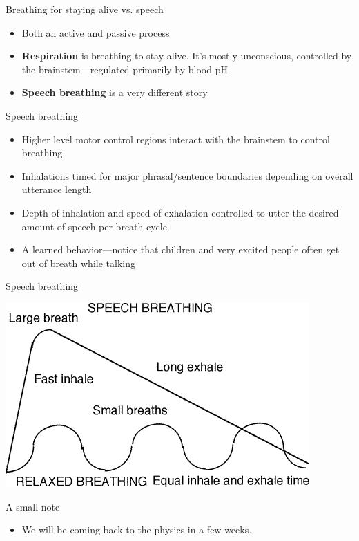 \documentclass[professionalfonts]{beamer}
\begin{document}
\begin{frame}{Breathing for staying alive vs. speech}
    \begin{itemize}
        \item Both an active and passive process
        \item \textbf{Respiration} is breathing to stay alive. It’s mostly unconscious, controlled by the brainstem—regulated primarily by blood pH
        \item \textbf{Speech breathing} is a very different story 
    \end{itemize}
\end{frame}

\begin{frame}{Speech breathing}
    \begin{itemize}
        \item Higher level motor control regions interact with the brainstem to control breathing 
        \item Inhalations timed for major phrasal/sentence boundaries depending on overall utterance length 
        \item Depth of inhalation and speed of exhalation controlled to utter the desired amount of speech per breath cycle 
        \item A learned behavior—notice that children and very excited people often get out of breath while talking 
    \end{itemize}
\end{frame}

\begin{frame}{Speech breathing}
    \begin{center}
        \includegraphics[width = .75\textwidth]{figs/SpeechBreathing.png}
    \end{center}
\end{frame}

\begin{frame}{A small note}
    \begin{itemize}
        \item We will be coming back to the physics in a few weeks. 
    \end{itemize}
\end{frame}
\end{document}
